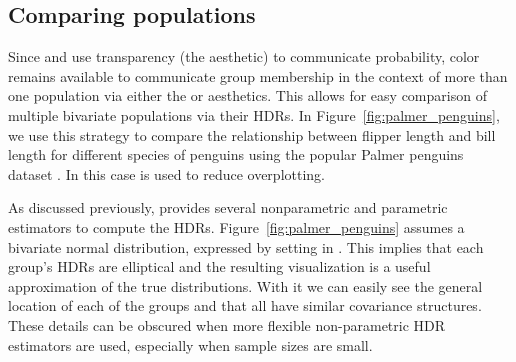 \subsection{Comparing populations}\label{sec:populations}


Since  and  use transparency (the  aesthetic) to communicate probability,
color remains available to communicate group membership in the context of more than one population via either the  or  aesthetics.
This allows for easy comparison of multiple bivariate populations via their HDRs.
In Figure~\ref{fig:palmer_penguins}, we use this strategy to compare the relationship between flipper length and bill length for different species of penguins using the popular Palmer penguins dataset \citep{horst_palmerpenguins_2020}.
In this case  is used to reduce overplotting.

As discussed previously,  provides several nonparametric and parametric estimators to compute the HDRs.
Figure~\ref{fig:palmer_penguins} assumes a bivariate normal distribution, expressed by setting  in .
This implies that each group's HDRs are elliptical and the resulting visualization is a useful
approximation of the true distributions.
With it we can easily see the general location of each of the groups and that all have similar covariance structures.
These details can be obscured when more flexible non-parametric HDR estimators are used, especially when sample sizes are small.


